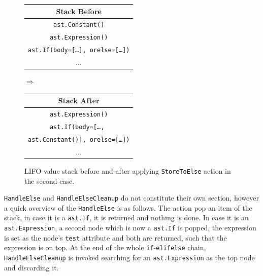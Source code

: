 \begin{figure}[H]\label{fig:storeToElse-stack-2}
  \centering
  {\small
  \begin{tabular}{|c|}
    \hline
    \textbf{Stack Before} \\ \hline
    \texttt{\tiny{ast.}}\texttt{Constant()}\\ \hline
    \texttt{\tiny{ast.}}\texttt{Expression()}\\ \hline
    \texttt{\tiny{ast.}}\texttt{If(body=[\dots], orelse=[\dots])}\\ \hline
    \(\dots\)             \\ \hline
  \end{tabular}
  \hspace{0.25em}$\Longrightarrow$\hspace{0.25em}
  \begin{tabular}{|c|}
    \hline
    \textbf{Stack After} \\ \hline
    \texttt{\tiny{ast.}}\texttt{Expression()}\\ \hline
    \texttt{\tiny{ast.}}\texttt{If(body=[\dots, }\\
    \texttt{\tiny{ast.}}\texttt{Constant()], orelse=[\dots])}\\ \hline
    \(\dots\)                       \\ \hline
  \end{tabular}
  }
  \caption{LIFO value stack before and after applying \texttt{StoreToElse} action in the second case.}
  
\end{figure}

\texttt{HandleElse} and \texttt{HandleElseCleanup} do not constitute their own section, however a quick overview of the \texttt{HandleElse} is as follows. The action pop an item of the stack, in case it is a \texttt{ast.If}, it is returned and nothing is done. In case it is an \texttt{ast.Expression}, a second node which is now a \texttt{ast.If} is popped, the expression is set as the node's \texttt{test} attribute and both are returned, such that the expression is on top.
At the end of the whole \texttt{if}-\texttt{elif}\texttt{else} chain, \texttt{HandleElseCleanup} is invoked searching for an \texttt{ast.Expression} as the top node and discarding it.


